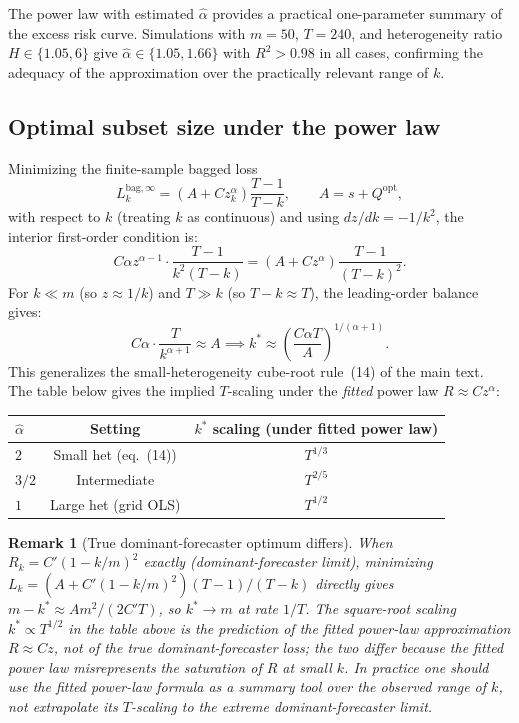 \documentclass[12pt]{article}
\newtheorem{remark}{Remark}
\theoremstyle{definition}
\begin{document}
The power law with estimated $\hat\alpha$ provides a
practical one-parameter summary of the excess risk curve.
Simulations with $m = 50$, $T = 240$, and heterogeneity ratio $H \in \{1.05, 6\}$ give
$\hat\alpha \in \{1.05, 1.66\}$ with $R^2 > 0.98$ in all cases, confirming the
adequacy of the approximation over the practically relevant range of $k$.

\subsection{Optimal subset size under the power law}

Minimizing the finite-sample bagged loss
\[
  L_k^{\mathrm{bag},\infty} = \left(A + Cz_k^\alpha\right)\frac{T-1}{T-k},
  \qquad A = s + Q^{\mathrm{opt}},
\]
with respect to $k$ (treating $k$ as continuous) and using $dz/dk = -1/k^2$,
the interior first-order condition is:
\[
  C\alpha z^{\alpha-1} \cdot \frac{T-1}{k^2(T-k)}
  = (A + Cz^\alpha)\frac{T-1}{(T-k)^2}.
\]
For $k \ll m$ (so $z \approx 1/k$) and $T \gg k$ (so $T - k \approx T$),
the leading-order balance gives:
\begin{equation}\label{eq:kstar_powerlaw}
  C\alpha \cdot \frac{T}{k^{\alpha+1}} \approx A
  \implies
  \boxed{k^* \approx \left(\frac{C\alpha T}{A}\right)^{\!1/(\alpha+1)}}.
\end{equation}
This generalizes the small-heterogeneity cube-root rule~(14) of the main text.
The table below gives the implied $T$-scaling under the \emph{fitted} power law $R \approx Cz^{\hat\alpha}$:

\medskip
\begin{center}
\begin{tabular}{lcc}
\toprule
$\hat\alpha$ & Setting & $k^*$ scaling (under fitted power law) \\
\midrule
$2$ & Small het (eq.~(14)) & $T^{1/3}$ \\
$3/2$ & Intermediate & $T^{2/5}$ \\
$1$ & Large het (grid OLS) & $T^{1/2}$ \\
\bottomrule
\end{tabular}
\end{center}
\medskip

\begin{remark}[True dominant-forecaster optimum differs]
  When $R_k = C'(1-k/m)^2$ exactly (dominant-forecaster limit), minimizing
  $L_k = (A + C'(1-k/m)^2)(T-1)/(T-k)$ directly gives
  $m - k^* \approx Am^2/(2C'T)$, so $k^* \to m$ at rate $1/T$.
  The square-root scaling $k^* \propto T^{1/2}$ in the table above is the
  prediction of the \emph{fitted} power-law approximation $R \approx Cz$, not of the
  true dominant-forecaster loss; the two differ because the fitted power law
  misrepresents the saturation of $R$ at small $k$.
  In practice one should use the fitted power-law formula as a summary tool
  over the observed range of $k$, not extrapolate its $T$-scaling to the
  extreme dominant-forecaster limit.
\end{remark}
\end{document}
